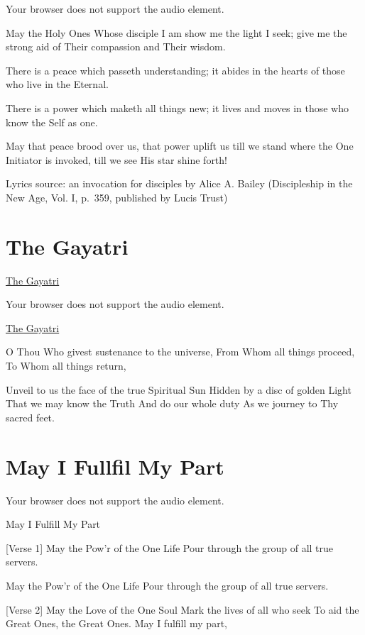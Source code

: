 \documentclass[
]{book}
\begin{document}
Your browser does not support the audio element.

May the Holy Ones
Whose disciple I am
show me the light I seek;
give me the strong aid
of Their compassion
and Their wisdom.

There is a peace
which passeth understanding;
it abides in the hearts
of those who live in the Eternal.

There is a power
which maketh all things new;
it lives and moves
in those who know the Self as one.

May that peace brood over us,
that power uplift us
till we stand
where the One Initiator is invoked,
till we see
His star shine forth!

Lyrics source: an invocation for disciples by Alice A. Bailey (Discipleship in the New Age, Vol. I, p.~359, published by Lucis Trust)

\hypertarget{the-gayatri}{%
\chapter{The Gayatri}\label{the-gayatri}}

\href{https://ngsm.org/mp3/The\%20Gayatri.mp3}{The Gayatri}

Your browser does not support the audio element.

\href{https://www.lucistrust.org/mantrams/the_gayatri}{The Gayatri}

O Thou Who givest sustenance to the universe,
From Whom all things proceed,
To Whom all things return,

Unveil to us the face of the true Spiritual Sun
Hidden by a disc of golden Light
That we may know the Truth
And do our whole duty
As we journey to Thy sacred feet.

\hypertarget{may-i-fullfil-my-part}{%
\chapter{May I Fullfil My Part}\label{may-i-fullfil-my-part}}

Your browser does not support the audio element.

May I Fulfill My Part

{[}Verse 1{]}
May the Pow'r of the One Life
Pour through the group of all true servers.

May the Pow'r of the One Life
Pour through the group of all true servers.

{[}Verse 2{]}
May the Love of the One Soul
Mark the lives of all who seek
To aid the Great Ones, the Great Ones.
May I fulfill my part,
\end{document}
